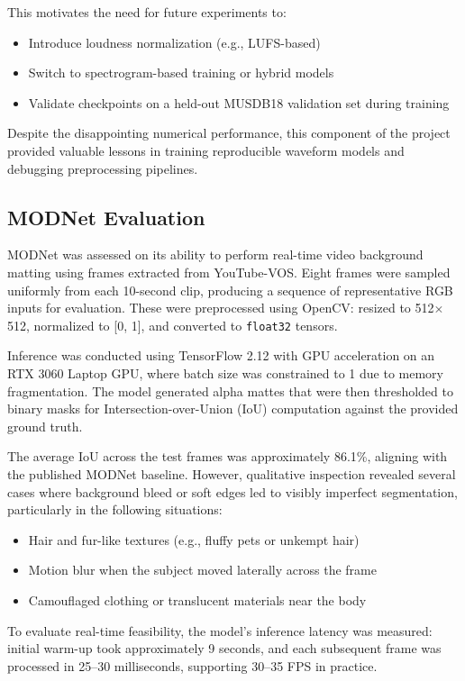 \documentclass{article}
\begin{document}
This motivates the need for future experiments to:
\begin{itemize}
  \item Introduce loudness normalization (e.g., LUFS-based)
  \item Switch to spectrogram-based training or hybrid models
  \item Validate checkpoints on a held-out MUSDB18 validation set during training
\end{itemize}

Despite the disappointing numerical performance, this component of the project provided valuable lessons in training reproducible waveform models and debugging preprocessing pipelines.

\subsection{MODNet Evaluation}

MODNet was assessed on its ability to perform real-time video background matting using frames extracted from YouTube-VOS. Eight frames were sampled uniformly from each 10-second clip, producing a sequence of representative RGB inputs for evaluation. These were preprocessed using OpenCV: resized to 512$\times$512, normalized to [0, 1], and converted to \texttt{float32} tensors.

Inference was conducted using TensorFlow 2.12 with GPU acceleration on an RTX 3060 Laptop GPU, where batch size was constrained to 1 due to memory fragmentation. The model generated alpha mattes that were then thresholded to binary masks for Intersection-over-Union (IoU) computation against the provided ground truth.

The average IoU across the test frames was approximately 86.1\%, aligning with the published MODNet baseline. However, qualitative inspection revealed several cases where background bleed or soft edges led to visibly imperfect segmentation, particularly in the following situations:
\begin{itemize}
  \item Hair and fur-like textures (e.g., fluffy pets or unkempt hair)
  \item Motion blur when the subject moved laterally across the frame
  \item Camouflaged clothing or translucent materials near the body
\end{itemize}

To evaluate real-time feasibility, the model’s inference latency was measured: initial warm-up took approximately 9 seconds, and each subsequent frame was processed in 25--30 milliseconds, supporting 30--35 FPS in practice.
\end{document}
